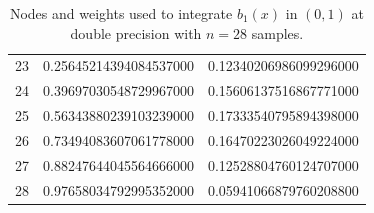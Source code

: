 \documentclass[a4paper, twosided]{book}
\begin{document}
\begin{table}[H]
\begin{tabular}{|c||c|c|}
23  &  0.25645214394084537000  &  0.12340206986099296000  \\
24  &  0.39697030548729967000  &  0.15606137516867771000  \\
25  &  0.56343880239103239000  &  0.17333540795894398000  \\
26  &  0.73494083607061778000  &  0.16470223026049224000  \\
27  &  0.88247644045564666000  &  0.12528804760124707000  \\
28  &  0.97658034792995352000  &  0.05941066879760208800  \\
\hline
\end{tabular}
  \caption{Nodes and weights used to integrate $b_1(x)$ in $(0,1)$ at double precision with $n=28$ samples.}
  \label{table2.5}
\end{table}
\end{document}

